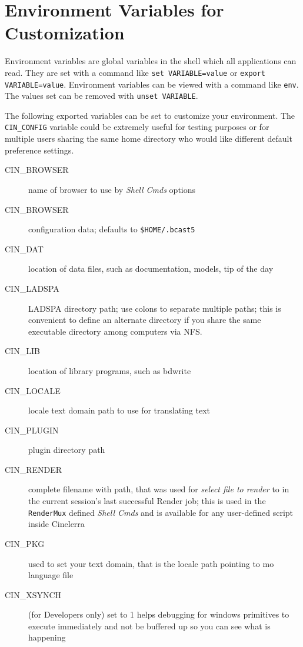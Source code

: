 \section{Environment Variables for Customization}%
\label{sec:environment_variables_customization}

Environment variables are global variables in the shell which all applications can read. They are set with a command like \texttt{set VARIABLE=value} or \texttt{export VARIABLE=value}. Environment variables can be viewed with a command like \texttt{env}.   The values set can be removed with \texttt{unset VARIABLE}.

The following exported variables can be set to customize your environment.  The \texttt{CIN\_CONFIG} variable could be extremely useful for testing purposes or for multiple users sharing the same home directory who would like different default preference settings.

\begin{description}
    \item[{\small CIN\_BROWSER}] name of browser to use by \textit{Shell Cmds} options
    \item[{\small CIN\_BROWSER}] configuration data; defaults to \texttt{\$HOME/.bcast5}
    \item[{\small CIN\_DAT}] location of data files, such as documentation, models, tip of the day
    \item[{\small CIN\_LADSPA}] LADSPA directory path; use colons to separate multiple paths; this is convenient to define an alternate directory if you share the same executable directory among computers via NFS.
    \item[{\small CIN\_LIB}] location of library programs, such as bdwrite
    \item[{\small CIN\_LOCALE}] locale text domain path to use for translating text
    \item[{\small CIN\_PLUGIN}] plugin directory path
    \item[{\small CIN\_RENDER}] complete filename with path, that was used for \textit{select file to render} to in the current session’s last successful Render job; this is used in the \texttt{RenderMux} defined \textit{Shell Cmds} and is available for any user-defined script inside Cinelerra
    \item[{\small CIN\_PKG}] used to set your text domain, that is the locale path pointing to mo language file
    \item[{\small CIN\_XSYNCH}] (for Developers only) set to 1 helps debugging for windows primitives to execute immediately and not be buffered up so you can see what is happening
\end{description}

